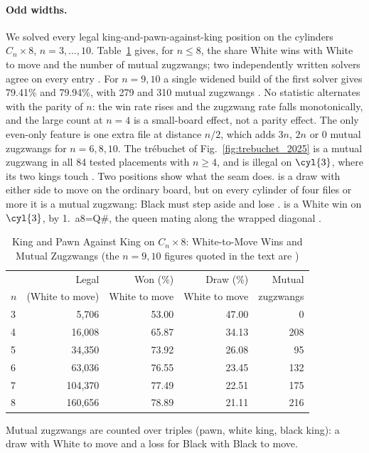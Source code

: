 
\paragraph{Odd widths.}
We solved every legal king-and-pawn-against-king position on the cylinders $C_n\times 8$, $n=3,\dots,10$.
Table~\ref{tab:oddw} gives, for $n\le 8$, the share White wins with White to move and the number of
mutual zugzwangs; two independently written solvers agree on every entry . For $n=9,10$ a
single widened build of the first solver gives 79.41\% and 79.94\%, with 279 and 310 mutual
zugzwangs . No statistic alternates with the parity of $n$: the win rate rises and the
zugzwang rate falls monotonically, and the large count at $n=4$ is a small-board effect, not a
parity effect. The only even-only feature is one extra file at distance $n/2$, which adds $3n$, $2n$
or $0$ mutual zugzwangs for $n=6,8,10$. The tr\'ebuchet of Fig.~\ref{fig:trebuchet_2025} is a mutual
zugzwang in all 84 tested placements with $n\ge 4$, and is illegal on $\cyl{3}$, where its two kings
touch . Two positions show what the seam does.  is a draw with
either side to move on the ordinary board, but on every cylinder of four files or more it is a mutual
zugzwang: Black must step aside and lose .  is a White win on
$\cyl{3}$, by 1.~a8=Q\#, the queen mating along the wrapped diagonal .

\begin{table}[!t]
\centering
\caption{King and Pawn Against King on $C_n\times 8$: White-to-Move Wins and Mutual Zugzwangs
 (the $n=9,10$ figures quoted in the text are )}
\label{tab:oddw}
\footnotesize
\begin{tabular}{@{}lrrrr@{}}
\toprule
& Legal & Won (\%) & Draw (\%) & Mutual \\
$n$ & (White to move) & White to move & White to move & zugzwangs \\
\midrule
3 & 5,706   & 53.00 & 47.00 & 0   \\
4 & 16,008  & 65.87 & 34.13 & 208 \\
5 & 34,350  & 73.92 & 26.08 & 95  \\
6 & 63,036  & 76.55 & 23.45 & 132 \\
7 & 104,370 & 77.49 & 22.51 & 175 \\
8 & 160,656 & 78.89 & 21.11 & 216 \\
\bottomrule
\end{tabular}

\smallskip
\parbox{\columnwidth}{\footnotesize Mutual zugzwangs are counted over triples (pawn, white king,
black king): a draw with White to move and a loss for Black with Black to move.}
\end{table}
